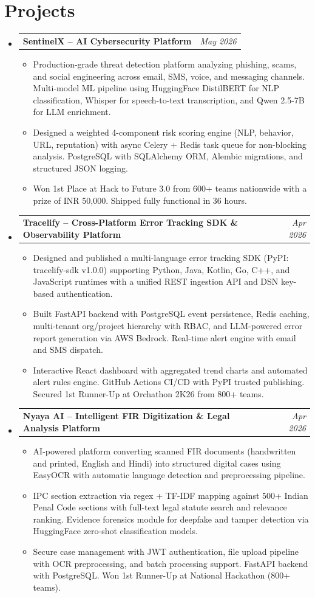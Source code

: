 \documentclass[letterpaper,10pt]{article}
\makeatletter
\newcommand{\resumeItem}[1]{\item\small{#1 \vspace{-3pt}}}
\newcommand{\resumeProjectHeading}[2]{
  \item
  \begin{tabular*}{0.97\textwidth}{l@{\extracolsep{\fill}}r}
    \small\textbf{#1} & \textit{\small #2}
  \end{tabular*}\vspace{-4pt}
}
\newcommand{\resumeSubHeadingListStart}{\begin{itemize}[leftmargin=0.15in, label={}]}
\newcommand{\resumeSubHeadingListEnd}{\end{itemize}}
\newcommand{\resumeItemListStart}{\begin{itemize}}
\newcommand{\resumeItemListEnd}{\end{itemize}\vspace{-5pt}}
\makeatother
\begin{document}
\section{Projects}
\resumeSubHeadingListStart
\resumeProjectHeading
  {SentinelX -- AI Cybersecurity Platform}{May 2026}
  \resumeItemListStart
    \resumeItem{Production-grade threat detection platform analyzing phishing, scams, and social engineering across email, SMS, voice, and messaging channels. Multi-model ML pipeline using HuggingFace DistilBERT for NLP classification, Whisper for speech-to-text transcription, and Qwen 2.5-7B for LLM enrichment.}
    \resumeItem{Designed a weighted 4-component risk scoring engine (NLP, behavior, URL, reputation) with async Celery + Redis task queue for non-blocking analysis. PostgreSQL with SQLAlchemy ORM, Alembic migrations, and structured JSON logging.}
    \resumeItem{Won 1st Place at Hack to Future 3.0 from 600+ teams nationwide with a prize of INR 50,000. Shipped fully functional in 36 hours.}
  \resumeItemListEnd
\resumeProjectHeading
  {Tracelify -- Cross-Platform Error Tracking SDK \& Observability Platform}{Apr 2026}
  \resumeItemListStart
    \resumeItem{Designed and published a multi-language error tracking SDK (PyPI: tracelify-sdk v1.0.0) supporting Python, Java, Kotlin, Go, C++, and JavaScript runtimes with a unified REST ingestion API and DSN key-based authentication.}
    \resumeItem{Built FastAPI backend with PostgreSQL event persistence, Redis caching, multi-tenant org/project hierarchy with RBAC, and LLM-powered error report generation via AWS Bedrock. Real-time alert engine with email and SMS dispatch.}
    \resumeItem{Interactive React dashboard with aggregated trend charts and automated alert rules engine. GitHub Actions CI/CD with PyPI trusted publishing. Secured 1st Runner-Up at Orchathon 2K26 from 800+ teams.}
  \resumeItemListEnd
\resumeProjectHeading
  {Nyaya AI -- Intelligent FIR Digitization \& Legal Analysis Platform}{Apr 2026}
  \resumeItemListStart
    \resumeItem{AI-powered platform converting scanned FIR documents (handwritten and printed, English and Hindi) into structured digital cases using EasyOCR with automatic language detection and preprocessing pipeline.}
    \resumeItem{IPC section extraction via regex + TF-IDF mapping against 500+ Indian Penal Code sections with full-text legal statute search and relevance ranking. Evidence forensics module for deepfake and tamper detection via HuggingFace zero-shot classification models.}
    \resumeItem{Secure case management with JWT authentication, file upload pipeline with OCR preprocessing, and batch processing support. FastAPI backend with PostgreSQL. Won 1st Runner-Up at National Hackathon (800+ teams).}
  \resumeItemListEnd
\resumeSubHeadingListEnd
\end{document}
